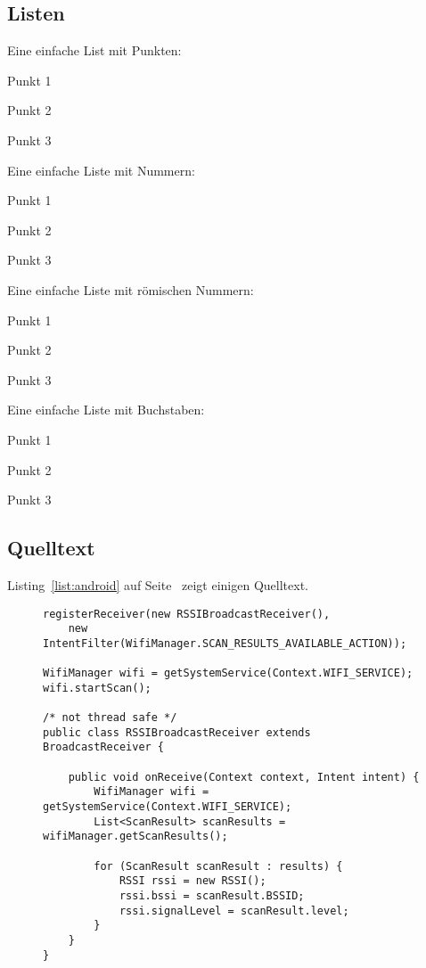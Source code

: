 \subsection{Listen}
\label{sec:Listen}
Eine einfache List mit Punkten:

\begin{compactitem}
	\item Punkt 1
	\item Punkt 2
	\item Punkt 3
\end{compactitem}

Eine einfache Liste mit Nummern:
\begin{compactenum}
	\item Punkt 1
	\item Punkt 2 
	\item Punkt 3
\end{compactenum}

Eine einfache Liste mit römischen Nummern:
\begin{compactenum}[I.]
	\item Punkt 1
	\item Punkt 2
	\item Punkt 3
\end{compactenum}

Eine einfache Liste mit Buchstaben:
\begin{compactenum}[(a)]
	\item Punkt 1
	\item Punkt 2 
	\item Punkt 3
\end{compactenum}

\subsection{Quelltext}

Listing~\ref{list:android} auf Seite~\pageref{list:android} zeigt einigen Quelltext.

\begin{figure}[bht]
\begin{lstlisting}[caption=Scanning for Wi-Fi Access Points on Android, label=list:android]
registerReceiver(new RSSIBroadcastReceiver(), 
    new IntentFilter(WifiManager.SCAN_RESULTS_AVAILABLE_ACTION));

WifiManager wifi = getSystemService(Context.WIFI_SERVICE);
wifi.startScan();

/* not thread safe */
public class RSSIBroadcastReceiver extends BroadcastReceiver {

    public void onReceive(Context context, Intent intent) {
        WifiManager wifi = getSystemService(Context.WIFI_SERVICE);
        List<ScanResult> scanResults = wifiManager.getScanResults();

        for (ScanResult scanResult : results) {
            RSSI rssi = new RSSI();
            rssi.bssi = scanResult.BSSID;
            rssi.signalLevel = scanResult.level;
        }
    }
}
\end{lstlisting}
\end{figure}